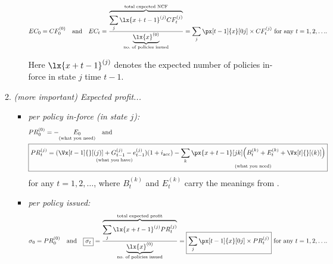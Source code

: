 \begin{enumerate}
\begin{enumerate}[label={(\arabic*)}]
\begin{itemize}
\[
EC_{0}=CF_{0}^{(0)}\qqtext{and}
EC_{t}=\frac{\overbrace{\sum_{j}^{}\lx{x+t-1}^{(j)}CF_{t}^{(j)}}^{\mathclap{\text{total expected NCF}}}}
{\underbrace{\lx{x}^{(0)}}_{\mathclap{\text{no.\ of policies issued}}}}
=\sum_{j}^{}\px[t-1]{x}[0j]\times CF_{t}^{(j)}
\text{ for any \(t=1,2,\dotsc\)}.
\]
\begin{note}
Here \(\lx{x+t-1}^{(j)}\) denotes the expected number of policies in-force in
state \(j\)  time \(t-1\).
\end{note}
\end{itemize}
\item \emph{(more important) Expected profit...}
\begin{itemize}
\item \emph{per policy in-force (in state \(j\)):}
\begin{align*}
&PR_{0}^{(0)}=-\underset{\text{(what you need)}}{E_0}\qqtext{and} \\
&\boxed{PR_{t}^{(j)}=\underset{\text{(what you have)}}{(\Vx[t-1]{}[(j)]+G_{t-1}^{(j)}-e_{t-1}^{(j)})(1+i_{\mathrm{acc}})}-
\underset{\text{(what you need)}}{\sum_{k}^{}\px{x+t-1}[jk]\qty(B_{t}^{(k)}+E_{t}^{(k)}+\Vx[t]{}[(k)])}}
\end{align*}
for any \(t=1,2,\dotsc\), where \(B_{t}^{(k)}\) and \(E_{t}^{(k)}\) carry the
meanings from .
\item \emph{per policy issued:}
\[
\sigma_0=PR_{0}^{(0)}\qqtext{and}
\boxed{\sigma_{t}}=\frac{\overbrace{\sum_{j}^{}\lx{x+t-1}^{(j)}PR_{t}^{(j)}}^{\mathclap{\text{total expected profit}}}}
{\underbrace{\lx{x}^{(0)}}_{\mathclap{\text{no.\ of policies issued}}}}
=\boxed{\sum_{j}^{}\px[t-1]{x}[0j]\times PR_{t}^{(j)}}
\text{ for any \(t=1,2,\dotsc\)}.
\]
\end{itemize}
\end{enumerate}
\end{enumerate}

